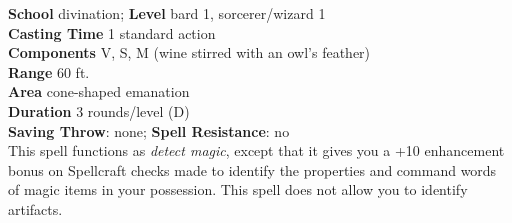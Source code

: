 \textbf{School }divination; \textbf{Level }bard 1, sorcerer/wizard 1\\
\textbf{Casting Time }1 standard action\\
\textbf{Components }V, S, M (wine stirred with an owl's feather)\\
\textbf{Range }60 ft.\\
\textbf{Area }cone-shaped emanation\\
\textbf{Duration }3 rounds/level (D)\\
\textbf{Saving Throw}: none; \textbf{Spell Resistance}: no\\
This spell functions as \textit{detect magic}, except that it gives you a +10 enhancement bonus on Spellcraft checks made to identify the properties and command words of magic items in your possession. This spell does not allow you to identify artifacts.\\
